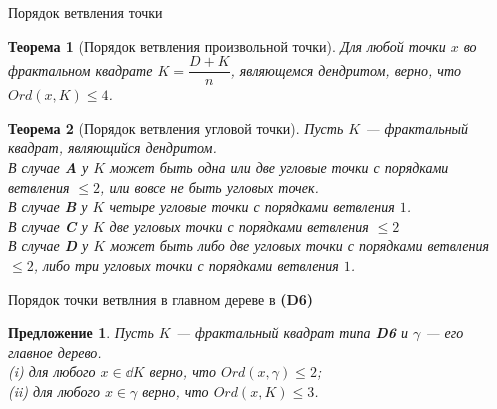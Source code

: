 \documentclass[aspectratio=1610, 10pt, notheorems]{beamer}
\newtheorem{theorem}     {Теорема}
\newtheorem{proposition} {Предложение}
\begin{document}
\begin{frame}{
}
\begin{center}
\end{center}
\end{frame}


\begin{frame}{Порядок ветвления точки}
\begin{theorem}[Порядок ветвления произвольной точки]
Для любой точки $x$ во фрактальном квадрате $K=\dfrac{D+K}{n}$, являющемся дендритом, верно, что $Ord(x,K)\le 4$.
\end{theorem}
\begin{theorem}[Порядок ветвления угловой точки]
Пусть $K$ --- фрактальный квадрат, являющийся дендритом. \\
В случае {\bf A} у $K$ может быть одна или две угловые точки с порядками ветвления $\le 2$, или вовсе не быть угловых точек.\\
В случае {\bf B} у $K$ четыре угловые точки с порядками ветвления $1$.\\
В случае {\bf C} у $K$ две угловых точки с порядками ветвления $\le 2$\\
В случае {\bf D} у $K$ может быть либо две угловых точки с порядками ветвления $\le 2$, либо три угловых точки с порядками ветвления $1$.
\end{theorem}
\end{frame}


\begin{frame}{Порядок точки ветвлния в главном дереве в \textbf{(D6)}}
\begin{proposition}\label{lem:d4bound}
Пусть $K$ --- фрактальный квадрат типа  {\bf D6}  и $\gamma$ --- его главное дерево.\\ 
 (i)  для любого $x\in\dd K$ верно, что $Ord(x,\gamma)\leq2$;\\
(ii) для любого $x\in\gamma$ верно, что $Ord(x,K)\leq3$.
\end{proposition}
\end{frame}
\end{document}
